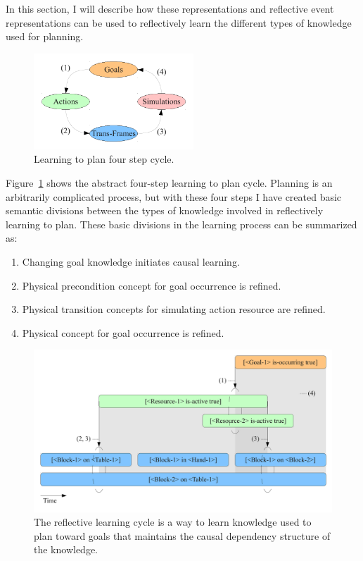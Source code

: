 In this section, I will describe how these representations and
reflective event representations can be used to reflectively learn the
different types of knowledge used for planning.

\begin{figure}[bth]
  \center
  \includegraphics[width=6cm]{gfx/learning_to_plan-four_step_cycle}
  \caption[Learning to plan four step cycle]{Learning to plan four step cycle.}
  \label{fig:learning_to_plan-four_step_cycle}
\end{figure}

Figure~\ref{fig:learning_to_plan-four_step_cycle} shows the abstract
four-step learning to plan cycle.  Planning is an arbitrarily
complicated process, but with these four steps I have created basic
semantic divisions between the types of knowledge involved in
reflectively learning to plan.  These basic divisions in the learning
process can be summarized as:

\begin{enumerate}
\item{Changing goal knowledge initiates causal learning.}
\item{Physical precondition concept for goal occurrence is refined.}
\item{Physical transition concepts for simulating action resource are refined.}
\item{Physical concept for goal occurrence is refined.}
\end{enumerate}

\begin{figure}[bth]
  \center
  \includegraphics[width=12cm]{gfx/learning_to_plan}
  \caption[The reflective learning cycle]{The reflective learning
    cycle is a way to learn knowledge used to plan toward goals that
    maintains the causal dependency structure of the knowledge.}
  \label{fig:learning_to_plan}
\end{figure}


